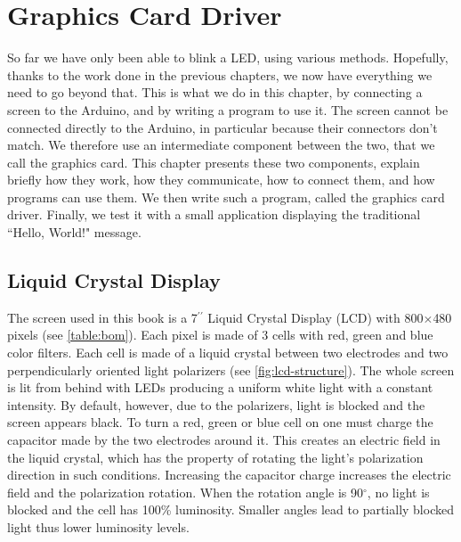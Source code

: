 
\renewcommand{\rustfile}{chapter5}
\setcounter{rustid}{0}


\chapter{Graphics Card Driver}\label{chapter:screen}

So far we have only been able to blink a LED, using various methods. Hopefully,
thanks to the work done in the previous chapters, we now have everything we
need to go beyond that. This is what we do in this chapter, by connecting a
screen to the Arduino, and by writing a program to use it. The screen cannot be
connected directly to the Arduino, in particular because their connectors don't
match. We therefore use an intermediate component between the two, that we call
the graphics card. This chapter presents these two components, explain briefly
how they work, how they communicate, how to connect them, and how programs can
use them. We then write such a program, called the graphics card driver.
Finally, we test it with a small application displaying the traditional
``Hello, World!" message.

\section{Liquid Crystal Display}

The screen used in this book is a 7$^{\prime\prime}$ Liquid Crystal Display
(LCD) with 800$\times$480 pixels (see \cref{table:bom}). Each pixel is made of
3 cells with red, green and blue color filters. Each cell is made of a liquid
crystal between two electrodes and two perpendicularly oriented light
polarizers (see \cref{fig:lcd-structure}). The whole screen is lit from behind
with LEDs producing a uniform white light with a constant intensity. By
default, however, due to the polarizers, light is blocked and the screen
appears black. To turn a red, green or blue cell on one must charge the
capacitor made by the two electrodes around it. This creates an electric field
in the liquid crystal, which has the property of rotating the light's
polarization direction in such conditions. Increasing the capacitor charge
increases the electric field and the polarization rotation. When the rotation
angle is 90$^\circ$, no light is blocked and the cell has 100\% luminosity.
Smaller angles lead to partially blocked light thus lower luminosity levels.

